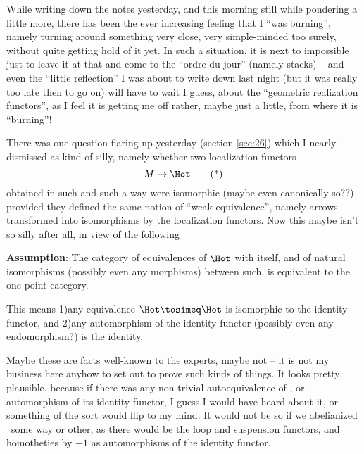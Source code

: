 \bigbreak

\presectionfill{}\par

\label{sec:28}%
While writing down the notes yesterday, and this morning still while
pondering a little more, there has been the ever increasing feeling
that I ``was burning'', namely turning around something very close,
very simple-minded too surely, without quite getting hold of it
yet. In such a situation, it is next to impossible just to leave it at
that and come to the ``ordre du jour'' (namely stacks) -- and even the
``little reflection'' I was about to write down last night (but it was
really too late then to go on) will have to wait I guess, about the
``geometric realization functors'', as I feel it is getting me off
rather, maybe just a little, from where it is ``burning''!

There was one question flaring up yesterday
(section \ref{sec:26}) which I nearly
dismissed as kind of silly, namely whether two localization functors
\begin{equation}
  \label{eq:28.star}
  M \to \Hot \tag{*}
\end{equation}
obtained in such and such a way were isomorphic (maybe even
canonically so??) provided they defined the same notion of ``weak
equivalence'', namely arrows transformed into isomorphisms by the
localization functors. Now this maybe isn't so silly after all, in
view of the following\par
\noindent \textbf{Assumption}: The category of equivalences of $\Hot$
with itself, and of natural isomorphisms (possibly even any morphisms)
between such, is equivalent to the one point category.

This means 1)\enspace any equivalence $\Hot \tosimeq \Hot$ is
isomorphic to the identity functor, and 2)\enspace any automorphism of
the identity functor (possibly even any endomorphism?) is the
identity.

Maybe these are facts well-known to the experts, maybe not -- it is
not my business here anyhow to set out to prove such kinds of
things. It looks pretty plausible, because if there was any
non-trivial autoequivalence of \Hot, or automorphism of its identity
functor, I guess I would have heard about it, or something of the sort
would flip to  my mind. It would not be so if we abelianized \Hot\
some way or other, as there would be the loop and suspension functors,
and homotheties by $-1$ as automorphisms of the identity functor.

